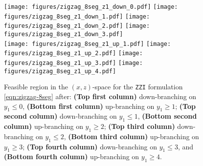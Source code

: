 \documentclass[opre,nonblindrev]{informs3} %
\newcommand{\ZZI}{\texttt{ZZI}}
\begin{document}
\begin{APPENDICES}
\begin{figure}[htpb]
    \texttt{[image: figures/zigzag\_8seg\_z1\_down\_0.pdf]}
    \texttt{[image: figures/zigzag\_8seg\_z1\_down\_1.pdf]}
    \texttt{[image: figures/zigzag\_8seg\_z1\_down\_2.pdf]}
    \texttt{[image: figures/zigzag\_8seg\_z1\_down\_3.pdf]} \\
    \texttt{[image: figures/zigzag\_8seg\_z1\_up\_1.pdf]}
    \texttt{[image: figures/zigzag\_8seg\_z1\_up\_2.pdf]}
    \texttt{[image: figures/zigzag\_8seg\_z1\_up\_3.pdf]}
    \texttt{[image: figures/zigzag\_8seg\_z1\_up\_4.pdf]}
    \caption{Feasible region in the $(x,z)$-space for the \ZZI{} formulation \eqref{eqn:zigzag-8seg} after: \textbf{(Top first column)} down-branching on $y_1 \leq 0$, \textbf{(Bottom first column)} up-branching on $y_1 \geq 1$; \textbf{(Top second column)} down-branching on $y_1 \leq 1$, \textbf{(Bottom second column)} up-branching on $y_1 \geq 2$; \textbf{(Top third column)} down-branching on $y_1 \leq 2$, \textbf{(Bottom third column)} up-branching on $y_1 \geq 3$; \textbf{(Top fourth column)} down-branching on $y_1 \leq 3$, and \textbf{(Bottom fourth column)} up-branching on $y_1 \geq 4$.}
    \label{fig:pwl-8seg-branching}
\end{figure}


\end{APPENDICES}
\end{document}

